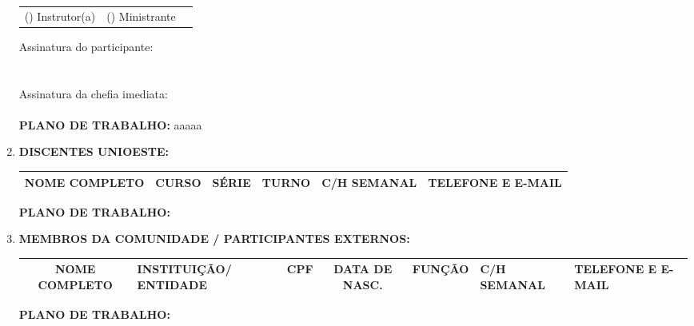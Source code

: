 \documentclass[12pt,a4paper,oneside]{article}%
\begin{document}
\begin{enumerate}
\begin{mdframed}[innertopmargin=5pt, innerleftmargin=3pt, innerrightmargin=3pt]
\begin{mdframed}[innertopmargin=5pt, innerleftmargin=3pt, innerrightmargin=3pt]
\begin{tabularx}{\linewidth}{XXX}
() Instrutor(a)&() Ministrante&\\%
\end{tabularx}%
\end{mdframed}%
\bigskip%
\bigskip%
Assinatura do participante: \hrulefill \\ \\ \\%
Assinatura da chefia imediata: \hrulefill \\ \\%
\textbf{PLANO DE TRABALHO: }%
aaaaa%
\end{mdframed}%
\item%
\textbf{DISCENTES UNIOESTE: }%
\newline%
{\scriptsize%
\begin{tabularx}{\linewidth}{|>{\centering\arraybackslash}X|
                          @{    }c@{    }|
                          @{    }c@{    }|
                          @{    }c@{    }|
                          @{    }c@{    }|
                          >{\centering\arraybackslash}X|
                          }%
\hline%
NOME COMPLETO&CURSO&SÉRIE&TURNO&C/H SEMANAL&TELEFONE E E{-}MAIL\\%
\hline%
\end{tabularx}%
\linebreak%
\begin{mdframed}[innertopmargin=5pt, innerleftmargin=3pt, innerrightmargin=3pt, topline=false]%
\textbf{PLANO DE TRABALHO: }%
\end{mdframed}%
}%
\item%
\textbf{MEMBROS DA COMUNIDADE / PARTICIPANTES EXTERNOS: }%
\newline%
{\scriptsize%
\begin{tabularx}{\linewidth}{|@{    }c@{    }|
                          >{\centering\arraybackslash}X|
                          @{    }c@{    }|
                          @{    }c@{    }|
                          @{    }c@{    }|
                          >{\centering\arraybackslash}X|
                          >{\centering\arraybackslash}X|
                          }%
\hline%
NOME COMPLETO&INSTITUIÇÃO/ ENTIDADE&CPF&DATA DE NASC.&FUNÇÃO&C/H SEMANAL&TELEFONE E E{-}MAIL\\%
\hline%
\end{tabularx}%
\linebreak%
\begin{mdframed}[innertopmargin=5pt, innerleftmargin=3pt, innerrightmargin=3pt, topline=false]%
\textbf{PLANO DE TRABALHO: }%
\end{mdframed}%
}%
\end{enumerate}%
\end{document}

